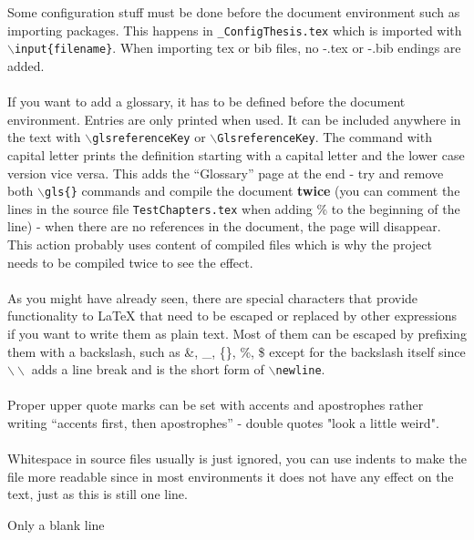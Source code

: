 Some configuration stuff must be done before the document environment such as importing packages. This happens in \texttt{\_ConfigThesis.tex} which is imported with \texttt{$\backslash$input\{filename\}}. When importing tex or bib files, no -.tex or -.bib endings are added.
\\
\\ If you want to add a glossary, it has to be defined before the document environment. Entries are only printed when used.
It can be included anywhere in the text with 
\texttt{$\backslash$gls{referenceKey}} or 
\texttt{$\backslash$Gls{referenceKey}}. 
The command with capital letter prints the definition starting with a capital letter and the lower case version vice versa. This adds the ``Glossary'' page at the end - try and remove both \texttt{$\backslash$gls\{\}} commands and compile the document \textbf{twice} (you can comment the lines in the source file \texttt{TestChapters.tex} when adding \% to the beginning of the line) - when there are no references in the document, the page will disappear. This action probably uses content of compiled files which is why the project needs to be compiled twice to see the effect. 
\\
\\ As you might have already seen, there are special characters that provide functionality to LaTeX that need to be escaped or replaced by other expressions if you want to write them as plain text. Most of them can be escaped by prefixing them with a backslash, such as \&, \_, \{\}, \%, \$ except for the backslash itself since $\backslash\backslash$ adds a line break and is the short form of \texttt{$\backslash$newline}. 
\\
\\ Proper upper quote marks can be set with accents and apostrophes rather writing ``accents first, then apostrophes'' - double quotes "look a little weird".
\\
\\ Whitespace in source files usually is just ignored, you can use indents to make the file more readable since in most environments it does not have any effect on the text,
just
as this		is still
one
	line.

Only a blank line

